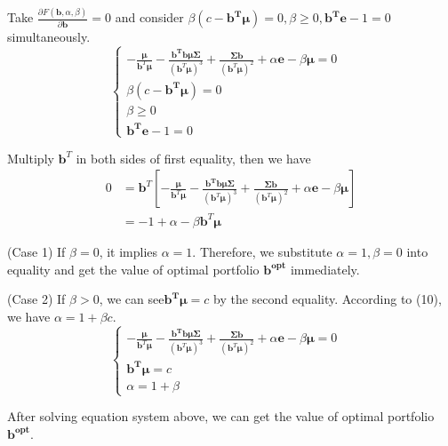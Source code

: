 \documentclass{gapd}
\begin{document}
Take $\frac{\partial F(\mathbf{b},\alpha, \beta)}{\partial \mathbf{b}}=0$ and consider $\beta(c-\mathbf{b^T\mu})=0, \beta \ge 0, \mathbf{b^Te}-1=0$ simultaneously.
$$\begin{cases}
-\frac{\boldsymbol{\mu}}{\mathbf{b}^T\boldsymbol{\mu}}-\frac{\mathbf{b^Tb}\boldsymbol{\mu \Sigma}}{(\mathbf{b}^T\boldsymbol{\mu})^3}+\frac{\boldsymbol{\Sigma}\mathbf{b}}{(\mathbf{b}^T\boldsymbol{\mu})^2}+\alpha \mathbf{e}-\beta \boldsymbol{\mu}=0& \\
\beta(c-\mathbf{b^T}\boldsymbol{\mu})=0 & \\
\beta \ge 0 & \\
\mathbf{b^Te}-1=0
\end{cases}$$

Multiply $\mathbf{b}^T$ in both sides of first equality, then we have
\begin{equation}
\begin{aligned}
0&=\mathbf{b}^T[-\frac{\boldsymbol{\mu}}{\mathbf{b}^T\boldsymbol{\mu}}-\frac{\mathbf{b^Tb}\boldsymbol{\mu \Sigma}}{(\mathbf{b}^T\boldsymbol{\mu})^3}+\frac{\boldsymbol{\Sigma}\mathbf{b}}{(\mathbf{b}^T\boldsymbol{\mu})^2}+\alpha \mathbf{e}-\beta \boldsymbol{\mu}]\\
&=-1+\alpha -\beta \mathbf{b}^T\boldsymbol{\mu}
\end{aligned}
\end{equation}

(Case 1) If $\beta = 0$, it implies $\alpha = 1$. Therefore, we substitute $\alpha =1, \beta =0$ into equality and get the  value of optimal portfolio $\mathbf{b^{opt}}$ immediately.

(Case 2) If $\beta >0$, we can see$\mathbf{b^T}\boldsymbol{\mu}=c$ by the second equality. According to (10), we have $\alpha=1+\beta c$.
$$\begin{cases}
-\frac{\boldsymbol{\mu}}{\mathbf{b}^T\boldsymbol{\mu}}-\frac{\mathbf{b^Tb}\boldsymbol{\mu \Sigma}}{(\mathbf{b}^T\boldsymbol{\mu})^3}+\frac{\boldsymbol{\Sigma}\mathbf{b}}{(\mathbf{b}^T\boldsymbol{\mu})^2}+\alpha \mathbf{e}-\beta \boldsymbol{\mu}=0& \\
\mathbf{b^T}\boldsymbol{\mu}=c & \\
\alpha=1+\beta & 
\end{cases}$$

After solving equation system above, we can get the  value of optimal portfolio $\mathbf{b^{opt}}$.
\end{document}
